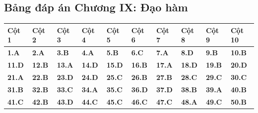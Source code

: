 \documentclass[11pt,a4paper]{article}
\begin{document}
\subsection*{\color{primary} Bảng đáp án Chương IX: Đạo hàm}
\begin{center}
\renewcommand{\arraystretch}{1.25}
\begin{tabularx}{\textwidth}{*{10}{>{\centering\arraybackslash}X}}
\toprule
\textbf{\color{primary} Cột 1} & \textbf{\color{primary} Cột 2} & \textbf{\color{primary} Cột 3} & \textbf{\color{primary} Cột 4} & \textbf{\color{primary} Cột 5} & \textbf{\color{primary} Cột 6} & \textbf{\color{primary} Cột 7} & \textbf{\color{primary} Cột 8} & \textbf{\color{primary} Cột 9} & \textbf{\color{primary} Cột 10} \\
\midrule
\textbf{1.A} & \textbf{2.A} & \textbf{3.B} & \textbf{4.A} & \textbf{5.B} & \textbf{6.C} & \textbf{7.A} & \textbf{8.D} & \textbf{9.B} & \textbf{10.B} \\
\rowcolor{rowtint} \textbf{11.D} & \textbf{12.B} & \textbf{13.A} & \textbf{14.D} & \textbf{15.D} & \textbf{16.B} & \textbf{17.A} & \textbf{18.D} & \textbf{19.B} & \textbf{20.D} \\
\textbf{21.A} & \textbf{22.B} & \textbf{23.D} & \textbf{24.D} & \textbf{25.C} & \textbf{26.B} & \textbf{27.B} & \textbf{28.C} & \textbf{29.C} & \textbf{30.C} \\
\rowcolor{rowtint} \textbf{31.B} & \textbf{32.B} & \textbf{33.C} & \textbf{34.A} & \textbf{35.C} & \textbf{36.D} & \textbf{37.D} & \textbf{38.B} & \textbf{39.A} & \textbf{40.B} \\
\textbf{41.C} & \textbf{42.B} & \textbf{43.D} & \textbf{44.C} & \textbf{45.C} & \textbf{46.C} & \textbf{47.C} & \textbf{48.A} & \textbf{49.C} & \textbf{50.B} \\
\bottomrule
\end{tabularx}
\end{center}\vspace{10pt}
\end{document}
